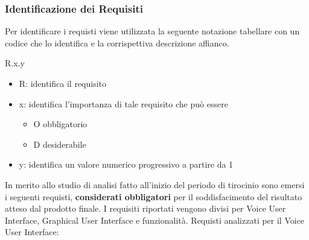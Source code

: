 \subsubsection{Identificazione dei Requisiti}
Per identificare i requisti viene utilizzata la seguente notazione tabellare con un codice che lo identifica e la corrispettiva descrizione affianco.
\begin{center}
    R.x.y
\end{center}
\begin{itemize}
    \item R: identifica il requisito
    \item x: identifica l'importanza di tale requisito che può essere
        \begin{itemize}
            \item O obbligatorio
            \item D desiderabile
        \end{itemize}
    \item y: identifica un valore numerico progressivo a partire da 1
\end{itemize}
In merito allo studio di analisi fatto all'inizio del periodo di tirocinio sono emersi i seguenti requisti, \textbf{considerati obbligatori} per il soddisfacimento del risultato atteso dal prodotto finale. I requisiti riportati vengono divisi per Voice User Interface, Graphical User Interface e funzionalità.
\newpage
\noindent Requisti analizzati per il Voice User Interface:
